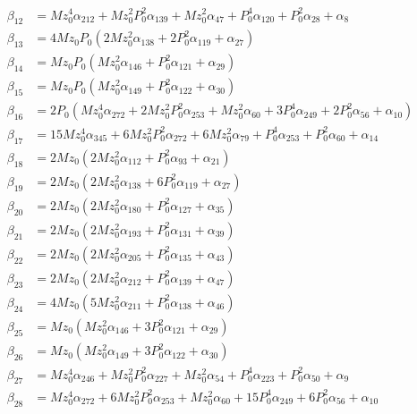 \documentclass{article}
\begin{document}
\begin{align*}
\beta_{12} &= Mz_{0}^{4} \alpha_{212} + Mz_{0}^{2} P_{0}^{2} \alpha_{139} + Mz_{0}^{2} \alpha_{47} + P_{0}^{4} \alpha_{120} + P_{0}^{2} \alpha_{28} + \alpha_{8} \\
\beta_{13} &= 4 Mz_{0} P_{0} \left(2 Mz_{0}^{2} \alpha_{138} + 2 P_{0}^{2} \alpha_{119} + \alpha_{27}\right) \\
\beta_{14} &= Mz_{0} P_{0} \left(Mz_{0}^{2} \alpha_{146} + P_{0}^{2} \alpha_{121} + \alpha_{29}\right) \\
\beta_{15} &= Mz_{0} P_{0} \left(Mz_{0}^{2} \alpha_{149} + P_{0}^{2} \alpha_{122} + \alpha_{30}\right) \\
\beta_{16} &= 2 P_{0} \left(Mz_{0}^{4} \alpha_{272} + 2 Mz_{0}^{2} P_{0}^{2} \alpha_{253} + Mz_{0}^{2} \alpha_{60} + 3 P_{0}^{4} \alpha_{249} + 2 P_{0}^{2} \alpha_{56} + \alpha_{10}\right) \\
\beta_{17} &= 15 Mz_{0}^{4} \alpha_{345} + 6 Mz_{0}^{2} P_{0}^{2} \alpha_{272} + 6 Mz_{0}^{2} \alpha_{79} + P_{0}^{4} \alpha_{253} + P_{0}^{2} \alpha_{60} + \alpha_{14} \\
\beta_{18} &= 2 Mz_{0} \left(2 Mz_{0}^{2} \alpha_{112} + P_{0}^{2} \alpha_{93} + \alpha_{21}\right) \\
\beta_{19} &= 2 Mz_{0} \left(2 Mz_{0}^{2} \alpha_{138} + 6 P_{0}^{2} \alpha_{119} + \alpha_{27}\right) \\
\beta_{20} &= 2 Mz_{0} \left(2 Mz_{0}^{2} \alpha_{180} + P_{0}^{2} \alpha_{127} + \alpha_{35}\right) \\
\beta_{21} &= 2 Mz_{0} \left(2 Mz_{0}^{2} \alpha_{193} + P_{0}^{2} \alpha_{131} + \alpha_{39}\right) \\
\beta_{22} &= 2 Mz_{0} \left(2 Mz_{0}^{2} \alpha_{205} + P_{0}^{2} \alpha_{135} + \alpha_{43}\right) \\
\beta_{23} &= 2 Mz_{0} \left(2 Mz_{0}^{2} \alpha_{212} + P_{0}^{2} \alpha_{139} + \alpha_{47}\right) \\
\beta_{24} &= 4 Mz_{0} \left(5 Mz_{0}^{2} \alpha_{211} + P_{0}^{2} \alpha_{138} + \alpha_{46}\right) \\
\beta_{25} &= Mz_{0} \left(Mz_{0}^{2} \alpha_{146} + 3 P_{0}^{2} \alpha_{121} + \alpha_{29}\right) \\
\beta_{26} &= Mz_{0} \left(Mz_{0}^{2} \alpha_{149} + 3 P_{0}^{2} \alpha_{122} + \alpha_{30}\right) \\
\beta_{27} &= Mz_{0}^{4} \alpha_{246} + Mz_{0}^{2} P_{0}^{2} \alpha_{227} + Mz_{0}^{2} \alpha_{54} + P_{0}^{4} \alpha_{223} + P_{0}^{2} \alpha_{50} + \alpha_{9} \\
\beta_{28} &= Mz_{0}^{4} \alpha_{272} + 6 Mz_{0}^{2} P_{0}^{2} \alpha_{253} + Mz_{0}^{2} \alpha_{60} + 15 P_{0}^{4} \alpha_{249} + 6 P_{0}^{2} \alpha_{56} + \alpha_{10} \\

\end{align*}
\end{document}
